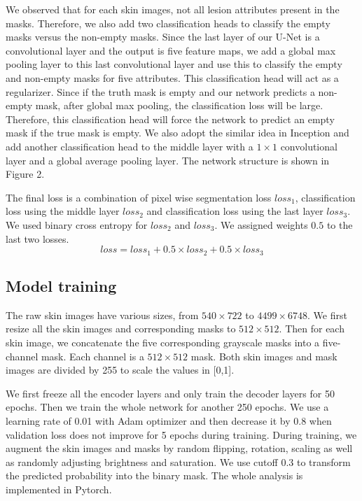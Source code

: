 \documentclass{article}
\begin{document}
We observed that for each skin images, not all lesion attributes present in the masks. Therefore, we also add two classification heads to classify the empty masks versus the non-empty masks. Since the last layer of our U-Net is a convolutional layer and the output is five feature maps, we add a global max pooling layer to this last convolutional layer and use this to classify the empty and non-empty masks for five attributes.  This classification head will act as a regularizer. Since if the truth mask is empty and our network predicts a non-empty mask, after global max pooling, the classification loss will be large. Therefore, this classification head will force the network to predict an empty mask if the true mask is empty.  We also adopt the similar idea in Inception \cite{szegedy2017inception} and add another classification head to the middle layer with a $1\times1$ convolutional layer and a global average pooling layer. The network structure is shown in Figure 2.

The final loss is a combination of pixel wise segmentation loss $loss_1$, classification loss using the middle layer $loss_2$ and classification loss using the last layer $loss_3$. We used binary cross entropy for $loss_2$ and $loss_3$. We assigned weights $0.5$ to the last two losses.  
\begin{equation}
loss=loss_1+0.5\times loss_2 + 0.5\times loss_3
\end{equation}

\subsection{Model training}
The raw skin images have various sizes, from $540\times722$ to $4499\times6748$. We first resize all the skin images and corresponding masks to $512\times512$. Then for each skin image, we concatenate the five corresponding grayscale masks into a five-channel mask. Each channel is a $512\times512$ mask.  Both skin images and mask images are divided by 255 to scale the values in [0,1].

We first freeze all the encoder layers and only train the decoder layers for 50 epochs. Then we train the whole network for another 250 epochs. We use a learning rate of 0.01 with Adam optimizer and then decrease it by 0.8 when validation loss does not improve for 5 epochs during training. During training, we augment the skin images and masks by random flipping, rotation, scaling as well as randomly adjusting brightness and saturation. We use cutoff 0.3 to transform the predicted probability into the binary mask. The whole analysis is implemented in Pytorch. 
\end{document}
